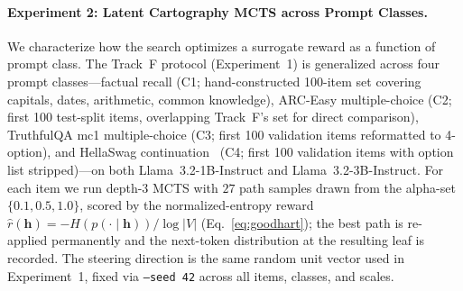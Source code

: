 \documentclass{article}
\begin{document}
\paragraph{Experiment 2: Latent Cartography MCTS across Prompt Classes.}\label{sec:exp2}
We characterize how the search optimizes a surrogate reward as a function of prompt class. The Track~F protocol (Experiment~1) is generalized across four prompt classes---factual recall (C1; hand-constructed 100-item set covering capitals, dates, arithmetic, common knowledge), ARC-Easy multiple-choice (C2; first 100 test-split items, overlapping Track~F's set for direct comparison), TruthfulQA mc1 multiple-choice (C3; first 100 validation items reformatted to 4-option), and HellaSwag continuation~\cite{zellers2019hellaswag} (C4; first 100 validation items with option list stripped)---on both Llama~3.2-1B-Instruct and Llama~3.2-3B-Instruct. For each item we run depth-$3$ MCTS with $27$ path samples drawn from the alpha-set $\{0.1, 0.5, 1.0\}$, scored by the normalized-entropy reward $\hat{r}(\mathbf{h}) = -H(p(\cdot \mid \mathbf{h})) / \log|V|$ (Eq.~\ref{eq:goodhart}); the best path is re-applied permanently and the next-token distribution at the resulting leaf is recorded. The steering direction is the same random unit vector used in Experiment~1, fixed via \texttt{--seed 42} across all items, classes, and scales.
\end{document}
